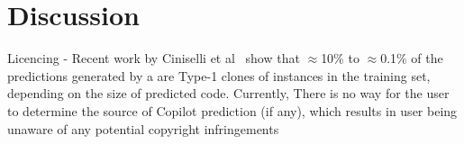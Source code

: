 \section{Discussion}
\label{smells:dis}

Licencing - Recent work by Ciniselli et al~\cite{code_clone} show that $\approx$10\% to $\approx$0.1\% of the predictions generated by a \cct{} are Type-1 clones of instances in the training set, depending on the size of predicted code. Currently, There is no way for the user to determine the source of Copilot prediction (if any), which results in user being unaware of any potential copyright infringements